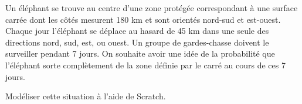 
Un éléphant se trouve au centre d'une zone protégée correspondant à une surface carrée dont les côtés mesurent 180 km et sont orientés nord-sud et est-ouest. Chaque jour l'éléphant se déplace au hasard de 45 km dans une seule des directions nord, sud, est, ou ouest. Un groupe de gardes-chasse doivent le surveiller pendant 7 jours. On souhaite avoir une idée de la probabilité que l'éléphant sorte complètement de la zone définie par le carré au cours de ces 7 jours.

Modéliser cette situation à l'aide de Scratch.